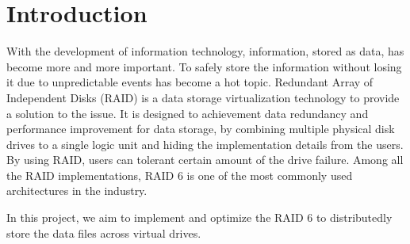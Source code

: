 \section{Introduction}

With the development of information technology, information, stored as data, has become more and more important. To safely store the information without losing it due to unpredictable events has become a hot topic. Redundant Array of Independent Disks (RAID) is a data storage virtualization technology to provide a solution to the issue. It is designed to achievement data redundancy and performance improvement for data storage, by combining multiple physical disk drives to a single logic unit and hiding the implementation details from the users. By using RAID, users can tolerant certain amount of the drive failure. Among all the RAID implementations, RAID 6 is one of the most commonly used architectures in the industry. 
 
In this project, we aim to implement and optimize the RAID 6 to distributedly store the data files across virtual drives.